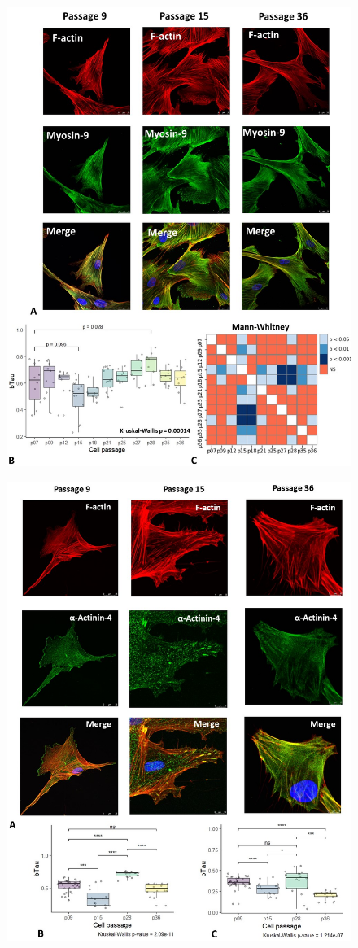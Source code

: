 \documentclass[alpha-refs]{wiley-article}
\begin{document}
\begin{figure}[hbt!]
\centering
\includegraphics[width=0.9\linewidth]{myosin-9.jpg}
\caption{}
\end{figure}

\begin{figure}[hbt!]
\centering
\includegraphics[width=0.9\linewidth]{alpha-actinin-4.jpg}
\caption{}
\end{figure}
\end{document}
